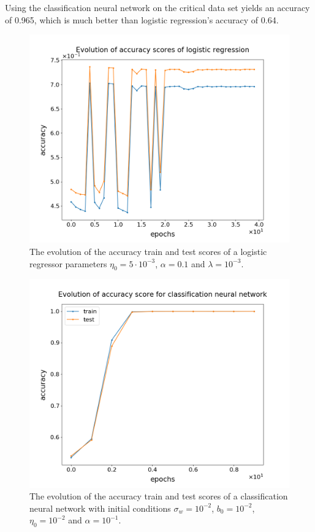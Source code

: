 \documentclass[nofootinbib,reprint,english]{revtex4-1}
\begin{document}
Using the classification neural network on the critical data set yields an accuracy of 0.965, which is much better than logistic regression's accuracy of 0.64.

\newpage

\begin{figure}[ht]
\centering
\includegraphics[scale=0.29]{../output/LogReg/AccuracyEvolution_0.png}
\caption{The evolution of the accuracy train and test scores of a logistic regressor parameters \(\eta_0=5\cdot10^{-3}\), \(\alpha=0.1\) and \(\lambda=10^{-3}\).}\label{fig:LogReg_AccuracyEvolution}
\end{figure}

\begin{figure}[ht]
\centering
\includegraphics[scale=0.29]{../output/NNClass/Accuracy_Evolution.png}
\caption{The evolution of the accuracy train and test scores of a classification neural network with initial conditions \(\sigma_w=10^{-2}\), \(b_0=10^{-2}\), \(\eta_0=10^{-2}\) and \(\alpha=10^{-1}\).}\label{fig:NNClass_AccuracyEvolution}
\end{figure}
\end{document}
